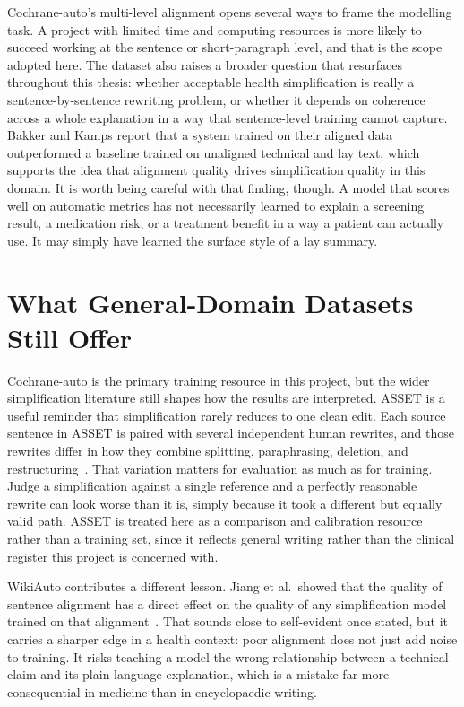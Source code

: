 Cochrane-auto's multi-level alignment opens several ways to frame the modelling task. A project with limited time and computing resources is more likely to succeed working at the sentence or short-paragraph level, and that is the scope adopted here. The dataset also raises a broader question that resurfaces throughout this thesis: whether acceptable health simplification is really a sentence-by-sentence rewriting problem, or whether it depends on coherence across a whole explanation in a way that sentence-level training cannot capture. Bakker and Kamps report that a system trained on their aligned data outperformed a baseline trained on unaligned technical and lay text, which supports the idea that alignment quality drives simplification quality in this domain. It is worth being careful with that finding, though. A model that scores well on automatic metrics has not necessarily learned to explain a screening result, a medication risk, or a treatment benefit in a way a patient can actually use. It may simply have learned the surface style of a lay summary.

\section{What General-Domain Datasets Still Offer}
\label{sec:general-domain-datasets}

Cochrane-auto is the primary training resource in this project, but the wider simplification literature still shapes how the results are interpreted. ASSET is a useful reminder that simplification rarely reduces to one clean edit. Each source sentence in ASSET is paired with several independent human rewrites, and those rewrites differ in how they combine splitting, paraphrasing, deletion, and restructuring~\cite{alvamanchego2020asset}. That variation matters for evaluation as much as for training. Judge a simplification against a single reference and a perfectly reasonable rewrite can look worse than it is, simply because it took a different but equally valid path. ASSET is treated here as a comparison and calibration resource rather than a training set, since it reflects general writing rather than the clinical register this project is concerned with.

WikiAuto contributes a different lesson. Jiang et al.\ showed that the quality of sentence alignment has a direct effect on the quality of any simplification model trained on that alignment~\cite{jiang2020wikiauto}. That sounds close to self-evident once stated, but it carries a sharper edge in a health context: poor alignment does not just add noise to training. It risks teaching a model the wrong relationship between a technical claim and its plain-language explanation, which is a mistake far more consequential in medicine than in encyclopaedic writing.

